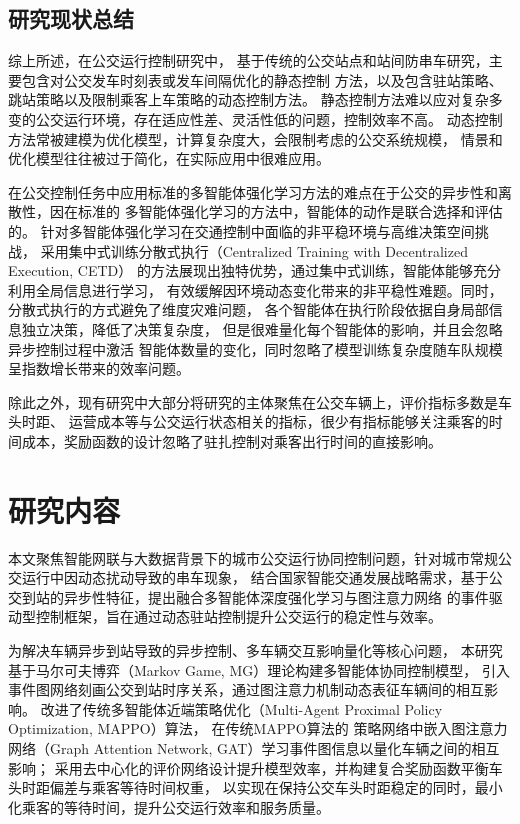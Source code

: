 \subsection{研究现状总结}
综上所述，在公交运行控制研究中，
基于传统的公交站点和站间防串车研究，主要包含对公交发车时刻表或发车间隔优化的静态控制
方法，以及包含驻站策略、跳站策略以及限制乘客上车策略的动态控制方法。
静态控制方法难以应对复杂多变的公交运行环境，存在适应性差、灵活性低的问题，控制效率不高。
动态控制方法常被建模为优化模型，计算复杂度大，会限制考虑的公交系统规模，
情景和优化模型往往被过于简化，在实际应用中很难应用。

在公交控制任务中应用标准的多智能体强化学习方法的难点在于公交的异步性和离散性，因在标准的
多智能体强化学习的方法中，智能体的动作是联合选择和评估的。
针对多智能体强化学习在交通控制中面临的非平稳环境与高维决策空间挑战，
采用集中式训练分散式执行（Centralized Training with Decentralized Execution, CETD）
的方法展现出独特优势，通过集中式训练，智能体能够充分利用全局信息进行学习，
有效缓解因环境动态变化带来的非平稳性难题。同时，分散式执行的方式避免了维度灾难问题，
各个智能体在执行阶段依据自身局部信息独立决策，降低了决策复杂度，
但是很难量化每个智能体的影响，并且会忽略异步控制过程中激活
智能体数量的变化\cite{egorov2022scalable}，同时忽略了模型训练复杂度随车队规模呈指数增长带来的效率问题。


除此之外，现有研究中大部分将研究的主体聚焦在公交车辆上，评价指标多数是车头时距、
运营成本等与公交运行状态相关的指标，很少有指标能够关注乘客的时间成本，奖励函数的设计忽略了驻扎控制对乘客出行时间的直接影响。
\section{研究内容}

本文聚焦智能网联与大数据背景下的城市公交运行协同控制问题，针对城市常规公交运行中因动态扰动导致的串车现象，
结合国家智能交通发展战略需求，基于公交到站的异步性特征，提出融合多智能体深度强化学习与图注意力网络
的事件驱动型控制框架，旨在通过动态驻站控制提升公交运行的稳定性与效率。

为解决车辆异步到站导致的异步控制、多车辆交互影响量化等核心问题，
本研究基于马尔可夫博弈（Markov Game, MG）理论构建多智能体协同控制模型，
引入事件图网络刻画公交到站时序关系，通过图注意力机制动态表征车辆间的相互影响。
改进了传统多智能体近端策略优化（Multi-Agent Proximal Policy Optimization, MAPPO）算法，
在传统MAPPO算法的
策略网络中嵌入图注意力网络（Graph Attention Network, GAT）学习事件图信息以量化车辆之间的相互影响；
采用去中心化的评价网络设计提升模型效率，并构建复合奖励函数平衡车头时距偏差与乘客等待时间权重，
以实现在保持公交车头时距稳定的同时，最小化乘客的等待时间，提升公交运行效率和服务质量。

